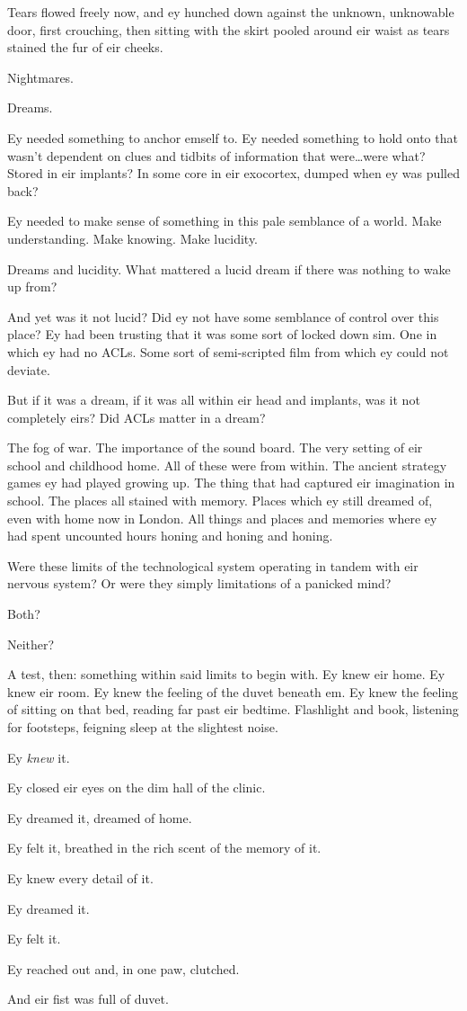 Tears flowed freely now, and ey hunched down against the unknown, unknowable door, first crouching, then sitting with the skirt pooled around eir waist as tears stained the fur of eir cheeks.

Nightmares.

Dreams.

Ey needed something to anchor emself to. Ey needed something to hold onto that wasn't dependent on clues and tidbits of information that were\ldots{}were what? Stored in eir implants? In some core in eir exocortex, dumped when ey was pulled back?

Ey needed to make sense of something in this pale semblance of a world. Make understanding. Make knowing. Make lucidity.

Dreams and lucidity. What mattered a lucid dream if there was nothing to wake up from?

And yet was it not lucid? Did ey not have some semblance of control over this place? Ey had been trusting that it was some sort of locked down sim. One in which ey had no ACLs. Some sort of semi-scripted film from which ey could not deviate.

But if it was a dream, if it was all within eir head and implants, was it not completely eirs? Did ACLs matter in a dream?

The fog of war. The importance of the sound board. The very setting of eir school and childhood home. All of these were from within. The ancient strategy games ey had played growing up. The thing that had captured eir imagination in school. The places all stained with memory. Places which ey still dreamed of, even with home now in London. All things and places and memories where ey had spent uncounted hours honing and honing and honing.

Were these limits of the technological system operating in tandem with eir nervous system? Or were they simply limitations of a panicked mind?

Both?

Neither?

A test, then: something within said limits to begin with. Ey knew eir home. Ey knew eir room. Ey knew the feeling of the duvet beneath em. Ey knew the feeling of sitting on that bed, reading far past eir bedtime. Flashlight and book, listening for footsteps, feigning sleep at the slightest noise.

Ey \emph{knew} it.

Ey closed eir eyes on the dim hall of the clinic.

Ey dreamed it, dreamed of home.

Ey felt it, breathed in the rich scent of the memory of it.

Ey knew every detail of it.

Ey dreamed it.

Ey felt it.

Ey reached out and, in one paw, clutched.

And eir fist was full of duvet.
